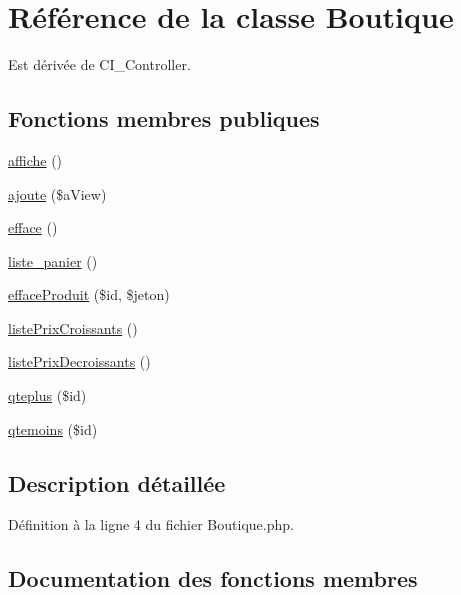\hypertarget{class_boutique}{}\section{Référence de la classe Boutique}
\label{class_boutique}


Est dérivée de C\+I\+\_\+\+Controller.

\subsection*{Fonctions membres publiques}
\begin{DoxyCompactItemize}
\item 
\mbox{\hyperlink{class_boutique_a1a9dd58e3fd913b4cba89ccdb470fb30}{affiche}} ()
\item 
\mbox{\hyperlink{class_boutique_a473cc69fd3a08a9e73f263bbc0d38f2c}{ajoute}} (\$a\+View)
\item 
\mbox{\hyperlink{class_boutique_a134b4b8e3a367ce837cfefa39fdecedf}{efface}} ()
\item 
\mbox{\hyperlink{class_boutique_ab968ad3c25b2d44e195fecd0edf93fd9}{liste\+\_\+panier}} ()
\item 
\mbox{\hyperlink{class_boutique_a0f210229b72863c53bb688ae89573590}{efface\+Produit}} (\$id, \$jeton)
\item 
\mbox{\hyperlink{class_boutique_ad7364067394e24f1b2f072e796421e41}{liste\+Prix\+Croissants}} ()
\item 
\mbox{\hyperlink{class_boutique_aec90b65cd01cf52d28896b79269b5a35}{liste\+Prix\+Decroissants}} ()
\item 
\mbox{\hyperlink{class_boutique_aba493c15d991bb9fb45402c45c019a0a}{qteplus}} (\$id)
\item 
\mbox{\hyperlink{class_boutique_ae286f28e37e1f03df804ad80e32dbe85}{qtemoins}} (\$id)
\end{DoxyCompactItemize}


\subsection{Description détaillée}


Définition à la ligne 4 du fichier Boutique.\+php.



\subsection{Documentation des fonctions membres}
\mbox{\label{class_boutique_a1a9dd58e3fd913b4cba89ccdb470fb30}} 
